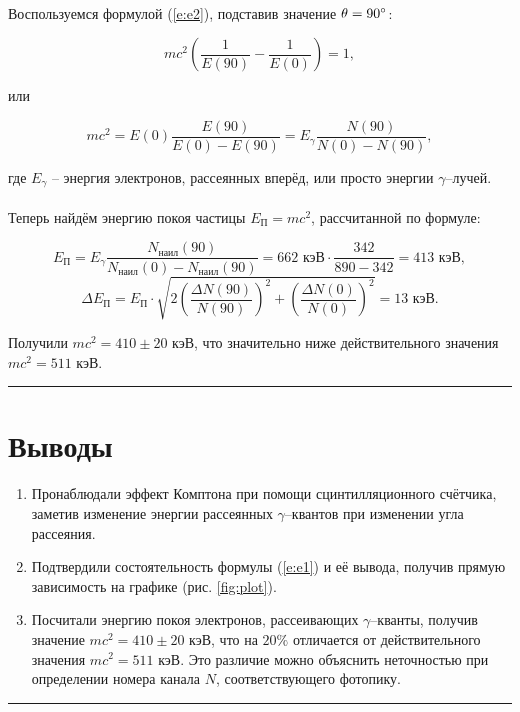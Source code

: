 \documentclass[a4paper,12pt]{article} %
\begin{document}
\paragraph{} Воспользуемся формулой (\ref{e:e2}), подставив значение $\theta = 90\degree$:

\[
mc^2 \left( \frac{1}{E(90)} - \frac{1}{E(0)} \right) = 1,
\]

\noindent или

\[
mc^2 = E(0)\frac{E(90)}{E(0) - E(90)} = E_\gamma \frac{N(90)}{N(0) - N(90)},
\]

\noindent где $E_\gamma$ -- энергия электронов, рассеянных вперёд, или просто энергии $\gamma$--лучей.

\paragraph{} Теперь найдём энергию покоя частицы $E_\text{П} = mc^2$, рассчитанной по формуле:

\[
E_\text{П} = E_\gamma \frac{N_\text{наил}(90)}{N_\text{наил}(0) - N_\text{наил}(90)} = 662 \text{ кэВ} \cdot \frac{342}{890 - 342} = 413 \text{ кэВ},
\] \[
\Delta E_\text{П} = E_\text{П} \cdot \sqrt{2 \left( \frac{\Delta N(90)}{N(90)} \right)^2 + \left( \frac{\Delta N(0)}{N(0)} \right)^2} = 13 \text{ кэВ}.
\]

Получили $mc^2 = 410 \pm 20$ кэВ, что значительно ниже действительного значения $mc^2 = 511$ кэВ.

\medskip\hrule\medskip

\section{Выводы}

\begin{enumerate}
\item Пронаблюдали эффект Комптона при помощи сцинтилляционного счётчика, заметив изменение энергии рассеянных $\gamma$--квантов при изменении угла рассеяния.
\item Подтвердили состоятельность формулы (\ref{e:e1}) и её вывода, получив прямую зависимость на графике (рис. \ref{fig:plot}).
\item Посчитали энергию покоя электронов, рассеивающих $\gamma$--кванты, получив значение $mc^2 = 410 \pm 20$ кэВ, что на $20\%$ отличается от действительного значения $mc^2 = 511$ кэВ. Это различие можно объяснить неточностью при определении номера канала $N$, соответствующего фотопику.
\end{enumerate}

\medskip\hrule\medskip
\end{document}
